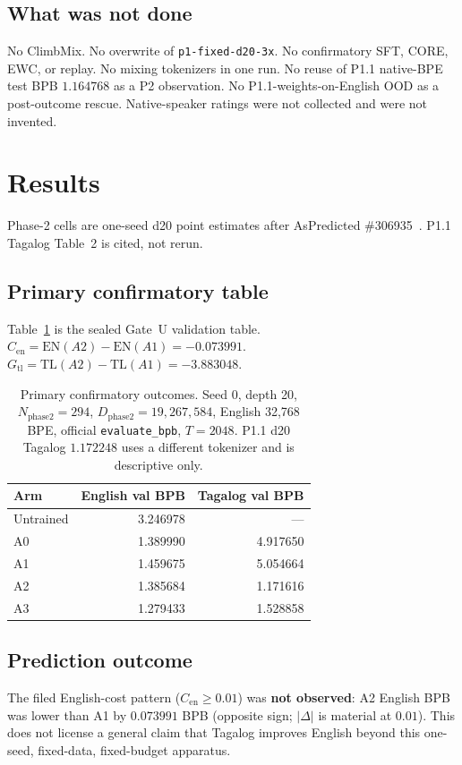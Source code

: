 \documentclass[11pt,a4paper]{article}
\begin{document}
\subsection{What was not done}
No ClimbMix. No overwrite of \texttt{p1-fixed-d20-3x}. No confirmatory SFT, CORE, EWC, or replay. No mixing tokenizers in one run. No reuse of P1.1 native-BPE test BPB $1.164768$ as a P2 observation. No P1.1-weights-on-English OOD as a post-outcome rescue. Native-speaker ratings were not collected and were not invented.

\section{Results}
\label{sec:results}

Phase-2 cells are one-seed d20 point estimates after AsPredicted \#306935~\cite{aspredicted306935,simmons2011falsepositive,wagenmakers2012confirmatory,nosek2018prereg}. P1.1 Tagalog Table~2 is cited, not rerun.

\subsection{Primary confirmatory table}
Table~\ref{tab:primary} is the sealed Gate~U validation table. $C_{\mathrm{en}}=\mathrm{EN}(A2)-\mathrm{EN}(A1)=-0.073991$. $G_{\mathrm{tl}}=\mathrm{TL}(A2)-\mathrm{TL}(A1)=-3.883048$.

\begin{table}[t]
\centering
\caption{Primary confirmatory outcomes. Seed 0, depth 20, $N_{\mathrm{phase2}}=294$, $D_{\mathrm{phase2}}=19{,}267{,}584$, English 32{,}768 BPE, official \texttt{evaluate\_bpb}, $T=2048$. P1.1 d20 Tagalog $1.172248$ uses a different tokenizer and is descriptive only.}
\label{tab:primary}
\begin{tabular}{lrr}
\toprule
Arm & English val BPB & Tagalog val BPB \\
\midrule
Untrained & 3.246978 & --- \\
A0 & 1.389990 & 4.917650 \\
A1 & 1.459675 & 5.054664 \\
A2 & 1.385684 & 1.171616 \\
A3 & 1.279433 & 1.528858 \\
\bottomrule
\end{tabular}
\end{table}

\subsection{Prediction outcome}
The filed English-cost pattern ($C_{\mathrm{en}}\ge 0.01$) was \textbf{not observed}: A2 English BPB was lower than A1 by $0.073991$ BPB (opposite sign; $\lvert\Delta\rvert$ is material at $0.01$). This does not license a general claim that Tagalog improves English beyond this one-seed, fixed-data, fixed-budget apparatus.
\end{document}
